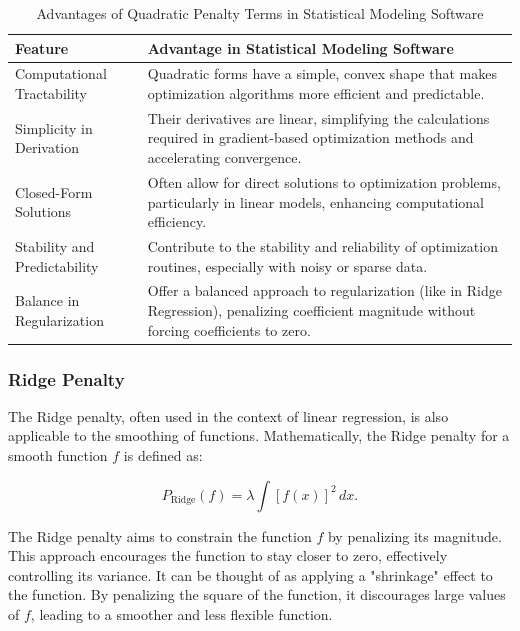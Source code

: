 \documentclass[12pt, twoside,hidelinks]{article}
\theoremstyle{definition}
\numberwithin{equation}{section}
\begin{document}
\begin{table}[H]
\centering
\begin{tabular}{|l|p{10cm}|}
\hline
\textbf{Feature} & \textbf{Advantage in Statistical Modeling Software} \\ \hline
Computational Tractability & Quadratic forms have a simple, convex shape that makes optimization algorithms more efficient and predictable. \\ \hline
Simplicity in Derivation & Their derivatives are linear, simplifying the calculations required in gradient-based optimization methods and accelerating convergence. \\ \hline
Closed-Form Solutions & Often allow for direct solutions to optimization problems, particularly in linear models, enhancing computational efficiency. \\ \hline
Stability and Predictability & Contribute to the stability and reliability of optimization routines, especially with noisy or sparse data. \\ \hline
Balance in Regularization & Offer a balanced approach to regularization (like in Ridge Regression), penalizing coefficient magnitude without forcing coefficients to zero. \\ \hline
\end{tabular}
\caption{Advantages of Quadratic Penalty Terms in Statistical Modeling Software}
\label{tab:quadratic_penalty_advantages}
\end{table}

\subsubsection*{Ridge Penalty}

The Ridge penalty, often used in the context of linear regression, is also applicable to the smoothing of functions. Mathematically, the Ridge penalty for a smooth function \( f \) is defined as:

\begin{equation}
    P_{\text{Ridge}}(f) = \lambda \int [f(x)]^2 \, dx.
    \label{eq:Ridge_penalty}
\end{equation}

The Ridge penalty aims to constrain the function \( f \) by penalizing its magnitude. This approach encourages the function to stay closer to zero, effectively controlling its variance. It can be thought of as applying a "shrinkage" effect to the function. By penalizing the square of the function, it discourages large values of \( f \), leading to a smoother and less flexible function.
\end{document}
